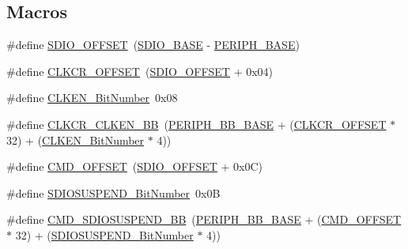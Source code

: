 \subsection*{Macros}
\begin{DoxyCompactItemize}
\item 
\#define \hyperlink{group___s_d_i_o___private___types_definitions_gabf07aced03df5f46d57cea1d4f56d1e3}{S\+D\+I\+O\+\_\+\+O\+F\+F\+S\+ET}~(\hyperlink{group___peripheral__memory__map_ga95dd0abbc6767893b4b02935fa846f52}{S\+D\+I\+O\+\_\+\+B\+A\+SE} -\/ \hyperlink{group___peripheral__memory__map_ga9171f49478fa86d932f89e78e73b88b0}{P\+E\+R\+I\+P\+H\+\_\+\+B\+A\+SE})
\item 
\#define \hyperlink{group___s_d_i_o___private___types_definitions_gac5d642be874338519fdec175204ca8ed}{C\+L\+K\+C\+R\+\_\+\+O\+F\+F\+S\+ET}~(\hyperlink{group___s_d_i_o___private___types_definitions_gabf07aced03df5f46d57cea1d4f56d1e3}{S\+D\+I\+O\+\_\+\+O\+F\+F\+S\+ET} + 0x04)
\item 
\#define \hyperlink{group___s_d_i_o___private___types_definitions_ga6ad1da47f9d84c54eb620b9231ebec86}{C\+L\+K\+E\+N\+\_\+\+Bit\+Number}~0x08
\item 
\#define \hyperlink{group___s_d_i_o___private___types_definitions_gabfb5772b9b734972b576309f7ca8bf92}{C\+L\+K\+C\+R\+\_\+\+C\+L\+K\+E\+N\+\_\+\+BB}~(\hyperlink{group___peripheral__memory__map_gaed7efc100877000845c236ccdc9e144a}{P\+E\+R\+I\+P\+H\+\_\+\+B\+B\+\_\+\+B\+A\+SE} + (\hyperlink{group___s_d_i_o___private___types_definitions_gac5d642be874338519fdec175204ca8ed}{C\+L\+K\+C\+R\+\_\+\+O\+F\+F\+S\+ET} $\ast$ 32) + (\hyperlink{group___s_d_i_o___private___types_definitions_ga6ad1da47f9d84c54eb620b9231ebec86}{C\+L\+K\+E\+N\+\_\+\+Bit\+Number} $\ast$ 4))
\item 
\#define \hyperlink{group___s_d_i_o___private___types_definitions_gaf12d26702ce7a88d2a3dae87f000b75e}{C\+M\+D\+\_\+\+O\+F\+F\+S\+ET}~(\hyperlink{group___s_d_i_o___private___types_definitions_gabf07aced03df5f46d57cea1d4f56d1e3}{S\+D\+I\+O\+\_\+\+O\+F\+F\+S\+ET} + 0x0\+C)
\item 
\#define \hyperlink{group___s_d_i_o___private___types_definitions_gaf88f03a42d76974b55dfb8bda65ade97}{S\+D\+I\+O\+S\+U\+S\+P\+E\+N\+D\+\_\+\+Bit\+Number}~0x0B
\item 
\#define \hyperlink{group___s_d_i_o___private___types_definitions_ga931e48aa282e2a937308f57f807e0781}{C\+M\+D\+\_\+\+S\+D\+I\+O\+S\+U\+S\+P\+E\+N\+D\+\_\+\+BB}~(\hyperlink{group___peripheral__memory__map_gaed7efc100877000845c236ccdc9e144a}{P\+E\+R\+I\+P\+H\+\_\+\+B\+B\+\_\+\+B\+A\+SE} + (\hyperlink{group___s_d_i_o___private___types_definitions_gaf12d26702ce7a88d2a3dae87f000b75e}{C\+M\+D\+\_\+\+O\+F\+F\+S\+ET} $\ast$ 32) + (\hyperlink{group___s_d_i_o___private___types_definitions_gaf88f03a42d76974b55dfb8bda65ade97}{S\+D\+I\+O\+S\+U\+S\+P\+E\+N\+D\+\_\+\+Bit\+Number} $\ast$ 4))

\end{DoxyCompactItemize}
